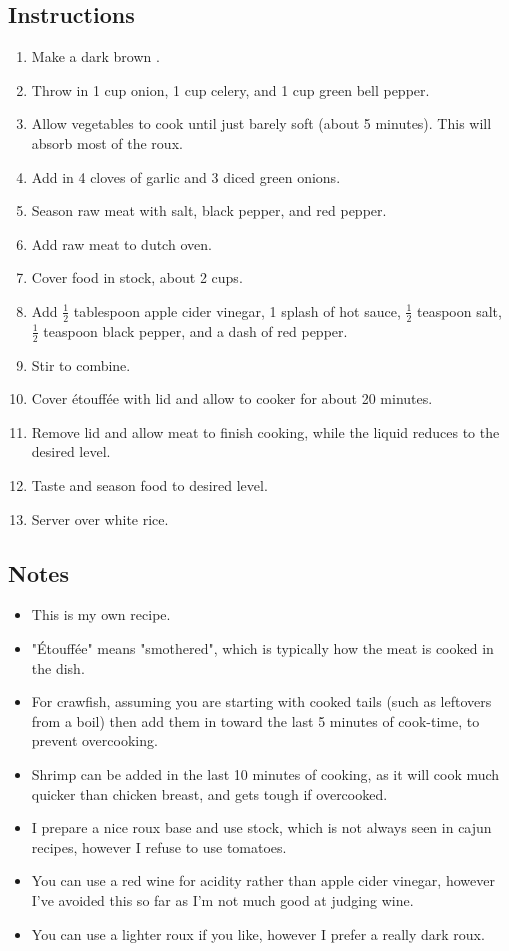 \begin{multicols}{2}
\subsection*{Instructions}
\begin{enumerate}
    \item Make a dark brown .
    \item Throw in 1 cup onion, 1 cup celery, and 1 cup green bell pepper.
    \item Allow vegetables to cook until just barely soft (about 5 minutes). This will absorb most of the roux.
    \item Add in 4 cloves of garlic and 3 diced green onions.
    \item Season raw meat with salt, black pepper, and red pepper.
    \item Add raw meat to dutch oven.
    \item Cover food in stock, about 2 cups.
    \item Add \( \frac{1}{2} \) tablespoon apple cider vinegar, 1 splash of hot sauce, \( \frac{1}{2} \) teaspoon salt, \( \frac{1}{2} \) teaspoon black pepper, and a dash of red pepper.
    \item Stir to combine.
    \item Cover étouffée with lid and allow to cooker for about 20 minutes.
    \item Remove lid and allow meat to finish cooking, while the liquid reduces to the desired level.
    \item Taste and season food to desired level.
    \item Server over white rice.
\end{enumerate}

\subsection*{Notes}
\begin{itemize}
    \item This is my own recipe.
    \item "Étouffée" means "smothered", which is typically how the meat is cooked in the dish.
    \item For crawfish, assuming you are starting with cooked tails (such as leftovers from a boil) then add them in toward the last 5 minutes of cook-time, to prevent overcooking.
    \item Shrimp can be added in the last 10 minutes of cooking, as it will cook much quicker than chicken breast, and gets tough if overcooked.
    \item I prepare a nice roux base and use stock, which is not always seen in cajun recipes, however I refuse to use tomatoes.
    \item You can use a red wine for acidity rather than apple cider vinegar, however I've avoided this so far as I'm not much good at judging wine.
    \item You can use a lighter roux if you like, however I prefer a really dark roux.
\end{itemize}
\end{multicols}
\clearpage